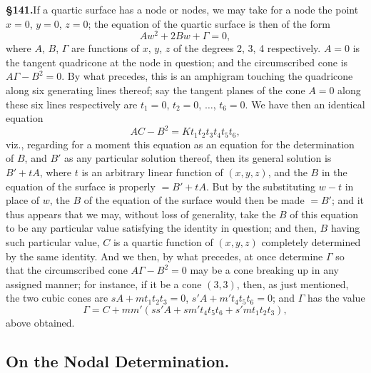 \documentclass[11pt,a4paper]{article}
\begin{document}
\textbf{\S 141.}\quad If a quartic surface has a node or nodes, we may take for a node the point $x = 0$, $y = 0$, $z = 0$; the equation of the quartic surface is then of the form
\[
Aw^2 + 2Bw + \Gamma = 0,
\]
where $A$, $B$, $\Gamma$ are functions of $x$, $y$, $z$ of the degrees 2, 3, 4 respectively. $A = 0$ is the tangent quadricone at the node in question; and the circumscribed cone is $A\Gamma - B^2 = 0$. By what precedes, this is an amphigram touching the quadricone along six generating lines thereof; say the tangent planes of the cone $A = 0$ along these six lines respectively are $t_1 = 0$, $t_2 = 0$, $\ldots$, $t_6 = 0$. We have then an identical equation
\[
AC - B^2 = Kt_1t_2t_3t_4t_5t_6,
\]
viz., regarding for a moment this equation as an equation for the determination of $B$, and $B'$ as any particular solution thereof, then its general solution is $B' + tA$, where $t$ is an arbitrary linear function of $(x, y, z)$, and the $B$ in the equation of the surface is properly $= B' + tA$. But by the substituting $w - t$ in place of $w$, the $B$ of the equation of the surface would then be made $= B'$; and it thus appears that we may, without loss of generality, take the $B$ of this equation to be any particular value satisfying the identity in question; and then, $B$ having such particular value, $C$ is a quartic function of $(x, y, z)$ completely determined by the same identity. And we then, by what precedes, at once determine $\Gamma$ so that the circumscribed cone $A\Gamma - B^2 = 0$ may be a cone breaking up in any assigned manner; for instance, if it be a cone $(3, 3)$, then, as just mentioned, the two cubic cones are $sA + mt_1t_2t_3 = 0$, $s'A + m't_4t_5t_6 = 0$; and $\Gamma$ has the value
\[
\Gamma = C + mm'(ss'A + sm't_4t_5t_6 + s'mt_1t_2t_3),
\]
above obtained.

\subsection*{On the Nodal Determination.}
\end{document}
